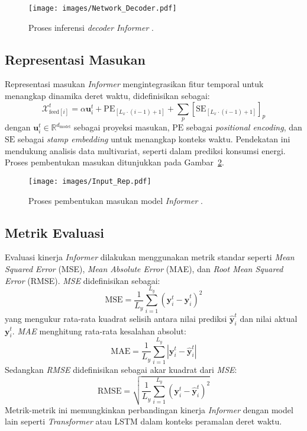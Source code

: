 \begin{figure}[H]
    \centering
    \texttt{[image: images/Network\_Decoder.pdf]}
    \caption{Proses inferensi \textit{decoder} \textit{Informer} \citep{Zhou2021}.}
    \label{fig:network_decoder}
\end{figure}

\subsection{Representasi Masukan}
\label{sec:input_representation}

Representasi masukan \textit{Informer} mengintegrasikan fitur temporal untuk menangkap dinamika deret waktu, didefinisikan sebagai:
\begin{equation}
\mathcal{X}_{\text{feed}[i]}^t = \alpha \mathbf{u}_i^t + \text{PE}_{[L_x \cdot (i-1) + 1]} + \sum_p [\text{SE}_{[L_x \cdot (i-1) + 1]}]_p
\end{equation}
dengan \( \mathbf{u}_i^t \in \mathbb{R}^{d_{\text{model}}} \) sebagai proyeksi masukan, \( \text{PE} \) sebagai \textit{positional encoding}, dan \( \text{SE} \) sebagai \textit{stamp embedding} untuk menangkap konteks waktu. Pendekatan ini mendukung analisis data multivariat, seperti dalam prediksi konsumsi energi. Proses pembentukan masukan ditunjukkan pada Gambar~\ref{fig:input_rep}.

\begin{figure}[H]
    \centering
    \texttt{[image: images/Input\_Rep.pdf]}
    \caption{Proses pembentukan masukan model \textit{Informer} \citep{Zhou2021}.}
    \label{fig:input_rep}
\end{figure}

\subsection{Metrik Evaluasi}
\label{sec:evaluation_metrics}

Evaluasi kinerja \textit{Informer} dilakukan menggunakan metrik standar seperti \textit{Mean Squared Error} (MSE), \textit{Mean Absolute Error} (MAE), dan \textit{Root Mean Squared Error} (RMSE). \textit{MSE} didefinisikan sebagai:
\begin{equation}
\text{MSE} = \frac{1}{L_y} \sum_{i=1}^{L_y} (\mathbf{y}_i^t - \hat{\mathbf{y}}_i^t)^2
\end{equation}
yang mengukur rata-rata kuadrat selisih antara nilai prediksi \( \hat{\mathbf{y}}_i^t \) dan nilai aktual \( \mathbf{y}_i^t \). \textit{MAE} menghitung rata-rata kesalahan absolut:
\begin{equation}
\text{MAE} = \frac{1}{L_y} \sum_{i=1}^{L_y} |\mathbf{y}_i^t - \hat{\mathbf{y}}_i^t|
\end{equation}
Sedangkan \textit{RMSE} didefinisikan sebagai akar kuadrat dari \textit{MSE}:
\begin{equation}
\text{RMSE} = \sqrt{\frac{1}{L_y} \sum_{i=1}^{L_y} (\mathbf{y}_i^t - \hat{\mathbf{y}}_i^t)^2}
\end{equation}
Metrik-metrik ini memungkinkan perbandingan kinerja \textit{Informer} dengan model lain seperti \textit{Transformer} atau LSTM dalam konteks peramalan deret waktu.

